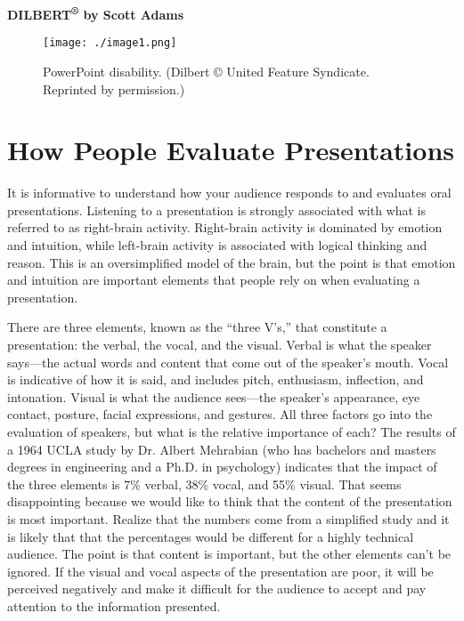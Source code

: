 \textbf{\hfill\break
DILBERT\textsuperscript{®} by Scott Adams}

\begin{figure}
\texttt{[image: ./image1.png]}
\caption{PowerPoint disability. (Dilbert © United Feature
Syndicate. Reprinted by permission.)}
\label{figure:dilbertPresentation}
\end{figure}

\section{How People Evaluate Presentations}
\label{section:how-people-evaluate-presentations}

It is informative to understand how your audience responds to and
evaluates oral presentations. Listening to a presentation is strongly
associated with what is referred to as right-brain activity. Right-brain
activity is dominated by emotion and intuition, while left-brain
activity is associated with logical thinking and reason. This is an
oversimplified model of the brain, but the point is that emotion and
intuition are important elements that people rely on when evaluating a
presentation.

There are three elements, known as the ``three V's,'' that constitute a
presentation: the verbal, the vocal, and the visual. Verbal is what the
speaker says---the actual words and content that come out of the
speaker's mouth. Vocal is indicative of how it is said, and includes
pitch, enthusiasm, inflection, and intonation. Visual is what the
audience sees---the speaker's appearance, eye contact, posture, facial
expressions, and gestures. All three factors go into the evaluation of
speakers, but what is the relative importance of each? The results of a
1964 UCLA study by Dr. Albert Mehrabian (who has bachelors and masters
degrees in engineering and a Ph.D. in psychology) indicates that the
impact of the three elements is 7\% verbal, 38\% vocal, and 55\% visual.
That seems disappointing because we would like to think that the content
of the presentation is most important. Realize that the numbers come
from a simplified study and it is likely that that the percentages would
be different for a highly technical audience. The point is that content
is important, but the other elements can't be ignored. If the visual and
vocal aspects of the presentation are poor, it will be perceived
negatively and make it difficult for the audience to accept and pay
attention to the information presented.

